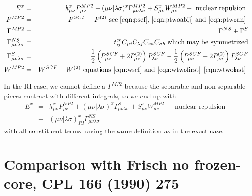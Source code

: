 \documentclass[fleqn,12pt]{article}
\newcommand{\half}{\frac{1}{2}}
\newcommand{\tijab}{{t_{ij}^{ab}}}
\newcommand{\Ptwo}{P^{(2)}}
\newcommand{\Wtwo}{W^{(2)}}
\newcommand{\intmri}[2]{( #1 | #2 )_{RI}}
\begin{document}
\begin{eqnarray}
  E^x & = & h^x_{\mu \nu} P^{MP2}_{\mu \nu} + 
     (\mu \nu | \lambda \sigma)^x \Gamma^{MP2}_{\mu \nu \lambda \sigma} +
     S^x_{\mu \nu} W^{MP2}_{\mu \nu} + \mbox{ nuclear repulsion } \\
  P^{MP2} & = & P^{SCF} + \Ptwo \mbox{ see \ref{eqn:pscf},
    \ref{eqn:ptwoabij} and \ref{eqn:ptwoan} } \\ 
  \Gamma^{MP2} & = & \Gamma^{NS} + \Gamma^{S} \\
  \Gamma^{NS}_{\mu \nu \lambda \sigma} & = & \tijab C_{\mu i}
  C_{\lambda j} C_{\nu a} C_{\sigma b} \mbox{ which may be
    symmetrized} \\
  \Gamma^{S}_{\mu \nu \lambda \sigma} & = &   
  \half\left(P^{SCF}_{\mu\nu} + 2 \Ptwo_{\mu\nu}\right)
  P^{SCF}_{\lambda\sigma} -  
  \half \left(P^{SCF}_{\mu\sigma} + 2 \Ptwo_{\mu\sigma}
  \right)P^{SCF}_{\lambda\nu}  \\
  W^{MP2} & = & W^{SCF} + \Wtwo \mbox{ equations \ref{eqn:wscf} and
    \ref{eqn:wtwofirst}--\ref{eqn:wtwolast} }
\end{eqnarray}
\begin{changebar}
In the RI case, we cannot define a $\Gamma^{MP2}$ because the
separable and non-separable pieces contract with different integrals,
so we end up with
\begin{eqnarray}
  E^x & = & h^x_{\mu \nu} P^{MP2}_{\mu \nu}
     + (\mu \nu | \lambda \sigma)^x \Gamma^{S}_{\mu \nu \lambda \sigma}
     + S^x_{\mu \nu} W^{MP2}_{\mu \nu} + \mbox{ nuclear repulsion } \\
& + & \intmri{\mu\nu}{\lambda\sigma}^{x} \Gamma^{NS}_{\mu \nu \lambda
     \sigma} \nonumber
\end{eqnarray}
with all constituent terms having the same definition as in the exact case.
\end{changebar}

\section{Comparison with Frisch no frozen-core, CPL 166 (1990) 275}
\end{document}

